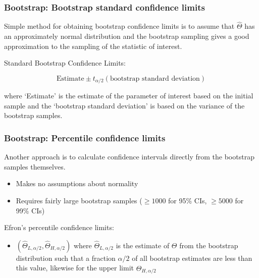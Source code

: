 \documentclass{beamer}
\begin{document}
\begin{frame}
  \frametitle{Bootstrap: Bootstrap standard confidence limits}

Simple method for obtaining bootstrap confidence limits is to assume that $\widehat{\Theta}$ has an approximately normal distribution and the bootstrap sampling gives a good approximation to the sampling of the statistic of interest.
\medskip

Standard Bootstrap Confidence Limits:

\[
\mbox{Estimate} \pm t_{\alpha/2} (\mbox{bootstrap standard deviation})
\]

where `Estimate' is the estimate of the parameter of interest based on the initial sample and the `bootstrap standard deviation' is based on the variance of the bootstrap samples.

\end{frame}
\begin{frame}
  \frametitle{Bootstrap: Percentile confidence limits}

Another approach is to calculate confidence intervals directly from the bootstrap samples themselves.

\begin{itemize}
    \item Makes no assumptions about normality
    \item Requires fairly large bootstrap samples ($\geq 1000$ for 95\% CIs, $\geq 5000$ for 99\% CIs)
\end{itemize}

Efron's percentile confidence limits:
\begin{itemize}
    \item $(\widehat{\Theta}_{L,\alpha/2}, \widehat{\Theta}_{H,\alpha/2})$ where $\widehat{\Theta}_{L,\alpha/2}$ is the estimate of $\Theta$ from the bootstrap distribution such that a fraction $\alpha/2$ of all bootstrap estimates are less than this value, likewise for the upper limit $\widehat{\Theta}_{H,\alpha/2}$
\end{itemize}


\end{frame}
\end{document}
